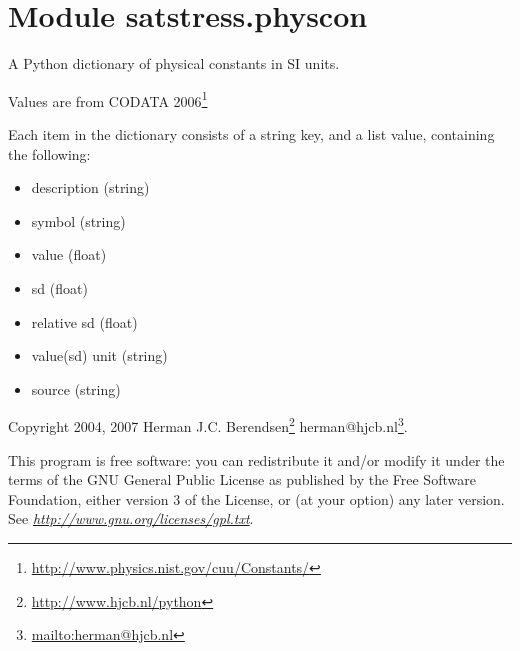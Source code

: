%
%
%


\section{Module satstress.physcon}

    \label{satstress:physcon}
A Python dictionary of physical constants in SI units.

Values are from CODATA 
2006\footnote{\href{http://www.physics.nist.gov/cuu/Constants/}{http://www.physics.nist.gov/cuu/Constants/}}

Each item in the dictionary consists of a string key, and a list value, 
containing the following:

\begin{itemize}
\setlength{\parskip}{0.6ex}
  \item description (string)

  \item symbol (string)

  \item value (float)

  \item sd (float)

  \item relative sd (float)

  \item value(sd) unit (string)

  \item source (string)

\end{itemize}

Copyright 2004, 2007 Herman J.C. 
Berendsen\footnote{\href{http://www.hjcb.nl/python}{http://www.hjcb.nl/python}}
herman@hjcb.nl\footnote{\href{mailto:herman@hjcb.nl}{mailto:herman@hjcb.nl}}.

This program is free software: you can redistribute it and/or modify it 
under the terms of the GNU General Public License as published by the Free 
Software Foundation, either version 3 of the License, or (at your option) 
any later version. See 
\href{http://www.gnu.org/licenses/gpl.txt}{\textit{http://www.gnu.org/licenses/gpl.txt}}.

